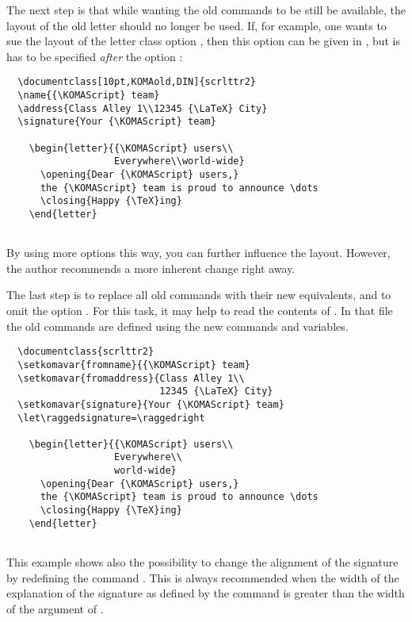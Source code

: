 The next step is that while wanting the old commands to be still be
available, the layout of the old letter should no longer be used. If,
for example, one wants to sue the layout of the letter class option
, then this option can be given in ,
but is has to be specified \emph{after} the option :

\begin{lstlisting}
  \documentclass[10pt,KOMAold,DIN]{scrlttr2}
  \name{{\KOMAScript} team}
  \address{Class Alley 1\\12345 {\LaTeX} City}
  \signature{Your {\KOMAScript} team}
  
    \begin{letter}{{\KOMAScript} users\\
                   Everywhere\\world-wide}
      \opening{Dear {\KOMAScript} users,}
      the {\KOMAScript} team is proud to announce \dots
      \closing{Happy {\TeX}ing}
    \end{letter}
  
\end{lstlisting}
By using more options this way, you can further influence the
layout. However, the author recommends a more inherent change right
away.

The last step is to replace all old commands with their new
equivalents, and to omit the option . For this task,
it may help to read the contents of .  In that file
the old commands are defined using the new commands and variables.

\begin{lstlisting}
  \documentclass{scrlttr2}
  \setkomavar{fromname}{{\KOMAScript} team}
  \setkomavar{fromaddress}{Class Alley 1\\
                           12345 {\LaTeX} City}
  \setkomavar{signature}{Your {\KOMAScript} team}
  \let\raggedsignature=\raggedright
  
    \begin{letter}{{\KOMAScript} users\\
                   Everywhere\\
                   world-wide}
      \opening{Dear {\KOMAScript} users,}
      the {\KOMAScript} team is proud to announce \dots
      \closing{Happy {\TeX}ing}
    \end{letter}
  
\end{lstlisting}
This example shows also the possibility to change the alignment of the
signature by redefining the command .  This is
always recommended when the width of the explanation of the signature as
defined by the command
\PParameter{\dots} is greater than the
width of the argument of .
%


